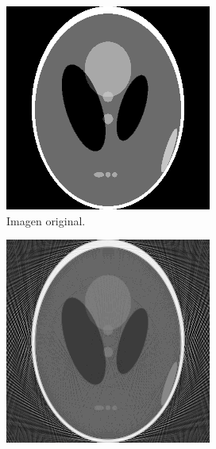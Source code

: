 \documentclass[letterpaper,12pt]{article}
\theoremstyle{plain}
\begin{document}
\begin{figure}[H]
   \centering
        \begin{subfigure}[h]{0.32\linewidth}
           \centering
           \includegraphics[width=\textwidth]{Figuras/SL_rasterizado_EQ.png}
           \caption{Imagen original.} 
           \label{fig:original}
        \end{subfigure}
        \begin{subfigure}[h]{0.32\linewidth}
           \centering
           \includegraphics[width=\textwidth]{Figuras/SL_rec_lineal_EQ.png}

\end{subfigure}
\end{figure}
\end{document}
